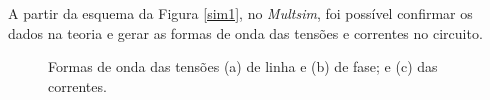\documentclass[a4paper,12pt,oneside,openany,table,xcdraw]{article}
\begin{document}
A partir da esquema da Figura \ref{sim1}, no \emph{Multsim}, foi possível confirmar os dados na teoria e gerar as formas de onda das tensões e correntes no circuito.

\begin{figure}[H]
\centering
{}


\caption{Formas de onda das tensões (a) de linha e (b) de fase; e (c) das correntes.}
\label{m1:simulacao}
\end{figure}
\end{document}
